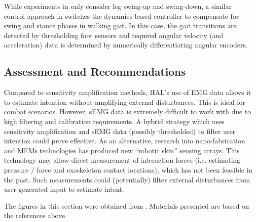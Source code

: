 \begin{refsection}
While experiments in \cite{HALmuscleImped2005} only consider leg swing-up and swing-down, a similar control approach in \cite{HALvTorqueImp2002} switches the dynamics based controller to compensate for swing and stance phases in walking gait.  In this case, the gait transitions are detected by thresholding foot sensors and required angular velocity (and acceleration) data is determined by numerically differentiating angular encoders.


\subsection{Assessment and Recommendations}

Compared to sensitivity amplification methods, HAL's use of EMG data allows it to estimate intention without amplifying external disturbances.  This is ideal for combat scenarios.  However, sEMG data is extremely difficult to work with due to high filtering and calibration requirements.  A hybrid strategy which uses sensitivity amplification and sEMG data (possibly thresholded) to filter user intention could prove effective.  As an alternative, research into nano-fabrication and MEMs technologies has produced new ``robotic skin'' sensing arrays. This technology may allow direct measurement of interaction forces (i.e. estimating pressure / force and exoskeleton contact locations), which has not been feasible in the past.  Such measurements could (potentially) filter external disturbances from user generated input to estimate intent.

\nocite{*}
\printbibliography[heading=subbibliography]

The figures in this section were obtained from \cite{HALmuscleImped2005,HALassist2011}.  Materials presented are based on the references above.

\end{refsection}